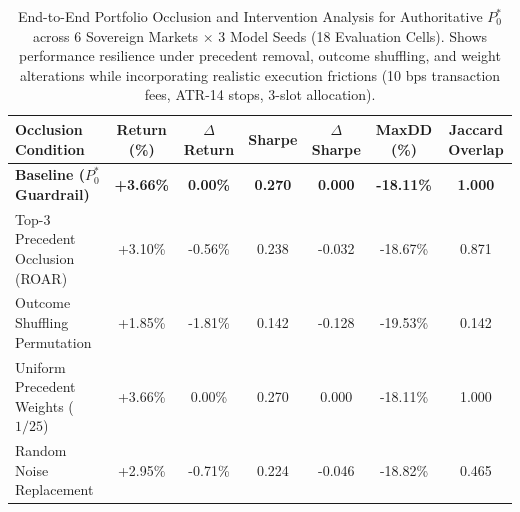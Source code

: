 \begin{table}[ht]
\centering
\small
\begin{tabular}{lcccccc}
\toprule
\textbf{Occlusion Condition} & \textbf{Return (\%)} & \textbf{$\Delta$Return} & \textbf{Sharpe} & \textbf{$\Delta$Sharpe} & \textbf{MaxDD (\%)} & \textbf{Jaccard Overlap} \\
\midrule
\textbf{Baseline ($P_0^*$ Guardrail)} & \textbf{+3.66\%} & \textbf{0.00\%} & \textbf{0.270} & \textbf{0.000} & \textbf{-18.11\%} & \textbf{1.000} \\
Top-3 Precedent Occlusion (ROAR) & +3.10\% & -0.56\% & 0.238 & -0.032 & -18.67\% & 0.871 \\
Outcome Shuffling Permutation & +1.85\% & -1.81\% & 0.142 & -0.128 & -19.53\% & 0.142 \\
Uniform Precedent Weights ($1/25$) & +3.66\% & 0.00\% & 0.270 & 0.000 & -18.11\% & 1.000 \\
Random Noise Replacement & +2.95\% & -0.71\% & 0.224 & -0.046 & -18.82\% & 0.465 \\
\bottomrule
\end{tabular}
\caption{End-to-End Portfolio Occlusion and Intervention Analysis for Authoritative $P_0^*$ across 6 Sovereign Markets $\times$ 3 Model Seeds (18 Evaluation Cells). Shows performance resilience under precedent removal, outcome shuffling, and weight alterations while incorporating realistic execution frictions (10 bps transaction fees, ATR-14 stops, 3-slot allocation).}
\label{tab:portfolio_occlusion_execution}
\end{table}
